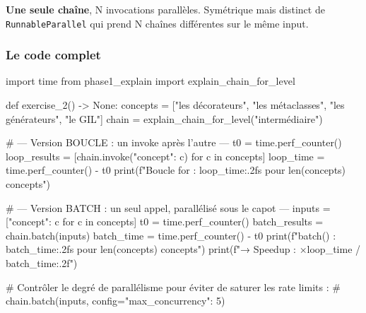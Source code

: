 \documentclass[11pt,a4paper]{article}
\begin{document}
\begin{center}
\end{center}

\textbf{Une seule chaîne}, N invocations parallèles. Symétrique mais
distinct de \texttt{RunnableParallel} qui prend N chaînes différentes
sur le même input.

\subsubsection{Le code complet}

\begin{pythoncode}
import time
from phase1_explain import explain_chain_for_level


def exercise_2() -> None:
    concepts = ["les décorateurs", "les métaclasses", "les générateurs", "le GIL"]
    chain = explain_chain_for_level("intermédiaire")

    # --- Version BOUCLE : un invoke après l'autre ---
    t0 = time.perf_counter()
    loop_results = [chain.invoke({"concept": c}) for c in concepts]
    loop_time = time.perf_counter() - t0
    print(f"Boucle for : {loop_time:.2f}s pour {len(concepts)} concepts")

    # --- Version BATCH : un seul appel, parallélisé sous le capot ---
    inputs = [{"concept": c} for c in concepts]
    t0 = time.perf_counter()
    batch_results = chain.batch(inputs)
    batch_time = time.perf_counter() - t0
    print(f"batch()    : {batch_time:.2f}s pour {len(concepts)} concepts")
    print(f"→ Speedup  : ×{loop_time / batch_time:.2f}")

    # Contrôler le degré de parallélisme pour éviter de saturer les rate limits :
    #   chain.batch(inputs, config={"max_concurrency": 5})
\end{pythoncode}
\end{document}
